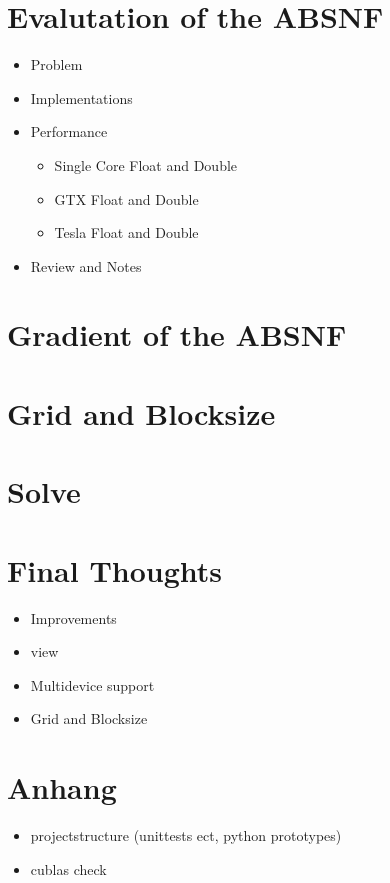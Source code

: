 \section{Evalutation of the ABSNF}
\begin{itemize}
	\item Problem
	\item Implementations
	\item Performance
	\begin{itemize}
		\item Single Core Float and Double
		\item GTX Float and Double
		\item Tesla Float and Double
	\end{itemize}
	\item Review and Notes
\end{itemize}
\section{Gradient of the ABSNF}
\section{Grid and Blocksize}
\section{Solve}
\section{Final Thoughts}
\begin{itemize}
	\item Improvements
	\item view
	\item Multidevice support
	\item Grid and Blocksize
\end{itemize}

\section{Anhang}
\begin{itemize}
	\item projectstructure (unittests ect, python prototypes)
	\item cublas check
\end{itemize}
